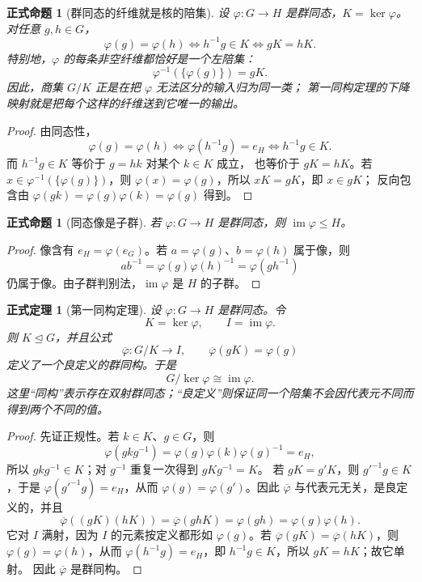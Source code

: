 \documentclass[UTF8,fontset=none,a4paper,11pt]{ctexart}
\theoremstyle{foundation-definition}
\theoremstyle{foundation-theorem}
\newtheorem{theorem}[definition]{正式定理}
\theoremstyle{foundation-proposition}
\newtheorem{proposition}[definition]{正式命题}
\theoremstyle{foundation-example}
\theoremstyle{foundation-remark}
\theoremstyle{foundation-theorem}
\begin{document}
\begin{proposition}[群同态的纤维就是核的陪集]\label{prop:group-hom-fibers-cosets}
设 \(\varphi:G\to H\) 是群同态，\(K=\ker\varphi\)。对任意 \(g,h\in G\)，
\[
\varphi(g)=\varphi(h)
\Longleftrightarrow
h^{-1}g\in K
\Longleftrightarrow
gK=hK.
\]
特别地，\(\varphi\) 的每条非空纤维都恰好是一个左陪集：
\[
\varphi^{-1}(\{\varphi(g)\})=gK.
\]
因此，商集 \(G/K\) 正是在把 \(\varphi\) 无法区分的输入归为同一类；
第一同构定理的下降映射就是把每个这样的纤维送到它唯一的输出。
\end{proposition}

\begin{proof}
由同态性，
\[
\varphi(g)=\varphi(h)
\Longleftrightarrow
\varphi(h^{-1}g)=e_H
\Longleftrightarrow h^{-1}g\in K.
\]
而 \(h^{-1}g\in K\) 等价于 \(g=hk\) 对某个 \(k\in K\) 成立，
也等价于 \(gK=hK\)。若 \(x\in\varphi^{-1}(\{\varphi(g)\})\)，则
\(\varphi(x)=\varphi(g)\)，所以 \(xK=gK\)，即 \(x\in gK\)；
反向包含由 \(\varphi(gk)=\varphi(g)\varphi(k)=\varphi(g)\) 得到。\end{proof}

\begin{proposition}[同态像是子群]\label{prop:hom-image-subgroup}
若 \(\varphi:G\to H\) 是群同态，则 \(\operatorname{im}\varphi\leq H\)。
\end{proposition}

\begin{proof}
像含有 \(e_H=\varphi(e_G)\)。若 \(a=\varphi(g)\)、\(b=\varphi(h)\) 属于像，则
\[
ab^{-1}=\varphi(g)\varphi(h)^{-1}=\varphi(gh^{-1})
\]
仍属于像。由子群判别法，\(\operatorname{im}\varphi\) 是 \(H\) 的子群。
\end{proof}

\begin{theorem}[第一同构定理]\label{thm:first-isomorphism}
设 \(\varphi:G\to H\) 是群同态。令
\[
  K=\ker\varphi,\qquad I=\operatorname{im}\varphi.
\]
则 \(K\trianglelefteq G\)，并且公式
\[
  \overline{\varphi}:G/K\longrightarrow I,
  \qquad \overline{\varphi}(gK)=\varphi(g)
\]
定义了一个良定义的群同构。于是
\[
  G/\ker\varphi\cong\operatorname{im}\varphi.
\]
这里“同构”表示存在双射群同态；“良定义”则保证同一个陪集不会因代表元不同而得到两个不同的值。
\end{theorem}

\begin{proof}
先证正规性。若 \(k\in K\)、\(g\in G\)，则
\[
  \varphi(gkg^{-1})=\varphi(g)\varphi(k)\varphi(g)^{-1}=e_H,
\]
所以 \(gkg^{-1}\in K\)；对 \(g^{-1}\) 重复一次得到 \(gKg^{-1}=K\)。
若 \(gK=g'K\)，则 \(g'^{-1}g\in K\)，于是
\(\varphi(g'^{-1}g)=e_H\)，从而 \(\varphi(g)=\varphi(g')\)。因此
\(\overline{\varphi}\) 与代表元无关，是良定义的，并且
\[
  \overline{\varphi}((gK)(hK))
  =\overline{\varphi}(ghK)=\varphi(gh)=\varphi(g)\varphi(h).
\]
它对 \(I\) 满射，因为 \(I\) 的元素按定义都形如 \(\varphi(g)\)。若
\(\overline{\varphi}(gK)=\overline{\varphi}(hK)\)，则
\(\varphi(g)=\varphi(h)\)，从而
\(\varphi(h^{-1}g)=e_H\)，即 \(h^{-1}g\in K\)，所以 \(gK=hK\)；故它单射。
因此 \(\overline{\varphi}\) 是群同构。
\end{proof}
\end{document}
